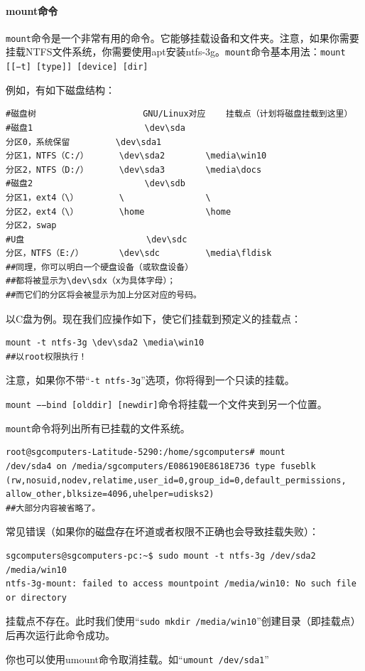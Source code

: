 \paragraph{mount命令}
\cite{manmnt}\par
\verb|mount|命令是一个非常有用的命令。它能够挂载设备和文件夹。注意，如果你需要挂载NTFS文件系统，你需要使用apt安装ntfs-3g。\verb|mount|命令基本用法：\verb|mount [[−t] [type]] [device] [dir]|\par
例如，有如下磁盘结构：
\begin{verbatim}
#磁盘树                     GNU/Linux对应    挂载点（计划将磁盘挂载到这里）
#磁盘1                      \dev\sda
分区0，系统保留         \dev\sda1
分区1，NTFS（C:/）      \dev\sda2        \media\win10
分区2，NTFS（D:/）      \dev\sda3        \media\docs
#磁盘2                      \dev\sdb
分区1，ext4（\）        \                \
分区2，ext4（\）        \home            \home
分区2，swap
#U盘                        \dev\sdc
分区，NTFS（E:/）       \dev\sdc         \media\fldisk
##同理，你可以明白一个硬盘设备（或软盘设备）
##都将被显示为\dev\sdx（x为具体字母）；
##而它们的分区将会被显示为加上分区对应的号码。
\end{verbatim} \par
以C盘为例。现在我们应操作如下，使它们挂载到预定义的挂载点：
\begin{verbatim}
mount -t ntfs-3g \dev\sda2 \media\win10
##以root权限执行！
\end{verbatim} \par
注意，如果你不带“\verb|-t ntfs-3g|”选项，你将得到一个只读的挂载。\par
\verb|mount −−bind [olddir] [newdir]|命令将挂载一个文件夹到另一个位置。\par
\verb|mount|命令将列出所有已挂载的文件系统。\par
\begin{verbatim}
root@sgcomputers-Latitude-5290:/home/sgcomputers# mount
/dev/sda4 on /media/sgcomputers/E086190E8618E736 type fuseblk
(rw,nosuid,nodev,relatime,user_id=0,group_id=0,default_permissions,
allow_other,blksize=4096,uhelper=udisks2)
##大部分内容被省略了。
\end{verbatim} \par
常见错误（如果你的磁盘存在坏道或者权限不正确也会导致挂载失败）：
\begin{verbatim}
sgcomputers@sgcomputers-pc:~$ sudo mount -t ntfs-3g /dev/sda2 /media/win10
ntfs-3g-mount: failed to access mountpoint /media/win10: No such file or directory
\end{verbatim} \par
挂载点不存在。此时我们使用“\verb|sudo mkdir /media/win10|”创建目录（即挂载点）后再次运行此命令成功。\par
你也可以使用umount命令取消挂载。如“\verb|umount /dev/sda1|”\par
